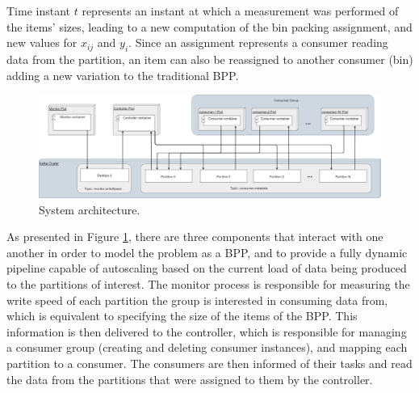 Time instant $t$ represents an instant at which a measurement was performed of
the items' sizes, leading to a new computation of the bin packing assignment,
and new values for $x_{ij}$ and $y_i$. Since an assignment represents a
consumer reading data from the partition, an item can also be reassigned to
another consumer (bin) adding a new variation to the traditional BPP. 

\begin{figure}[htb!] \centering
    \includegraphics[width=\textwidth]{images/controller/System Design.png}
    \caption{System architecture.} 
    \label{fig:system_architecture}
\end{figure}

As presented in Figure \ref{fig:system_architecture}, there are three components
that interact with one another in order to model the problem as a BPP, and to
provide a fully dynamic pipeline capable of autoscaling based on the current
load of data being produced to the partitions of interest. The monitor process
is responsible for measuring the write speed of each partition the group is
interested in consuming data from, which is equivalent to specifying the size of
the items of the BPP.  This information is then delivered to the controller,
which is responsible for managing a consumer group (creating and deleting
consumer instances), and mapping each partition to a consumer. The consumers are
then informed of their tasks and read the data from the partitions that were
assigned to them by the controller.

